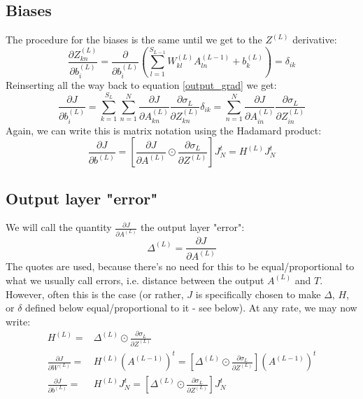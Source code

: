 \documentclass[12pt, a4paper]{article}
\numberwithin{equation}{section}
\begin{document}
\subsection{Biases}
The procedure for the biases is the same until we get to the $Z^{(L)}$ derivative:
\begin{equation}
\frac{\partial Z^{(L)}_{kn}}{\partial b^{(L)}_i}=\frac{\partial}{\partial b^{(L)}_i}\left(\sum_{l=1}^{S_{L-1}}W^{(L)}_{kl}A^{(L-1)}_{ln}+b^{(L)}_k\right)=\delta_{ik}
\end{equation}
Reinserting all the way back to equation \ref{output_grad} we get:
\begin{equation}
\frac{\partial J}{\partial b^{(L)}_i}=\sum_{k=1}^{S_L}\sum_{n=1}^N\frac{\partial J}{\partial A^{(L)}_{kn}}\frac{\partial\sigma_L}{\partial Z^{(L)}_{kn}}\delta_{ik}=\sum_{n=1}^N\frac{\partial J}{\partial A^{(L)}_{in}}\frac{\partial\sigma_L}{\partial Z^{(L)}_{in}}
\end{equation}
Again, we can write this is matrix notation using the Hadamard product:
\begin{equation}
\label{output_bias_matrix}
\frac{\partial J}{\partial b^{(L)}}=\left[\frac{\partial J}{\partial A^{(L)}}\odot\frac{\partial\sigma_L}{\partial Z^{(L)}}\right]J_N^t=H^{(L)}J_N^t
\end{equation}

\subsection{Output layer "error"}
We will call the quantity $\frac{\partial J}{\partial A^{(L)}}$ the output layer "error":
\begin{equation}
\Delta^{(L)}=\frac{\partial J}{\partial A^{(L)}}
\end{equation}
The quotes are used, because there's no need for this to be equal/proportional to what we usually call errors, i.e. distance between the output $A^{(L)}$ and $T$. However, often this is the case (or rather, $J$ is specifically chosen to make $\Delta$, $H$, or $\delta$ defined below equal/proportional to it - see below). At any rate, we may now write:
\begin{align}
\label{output_weights_H}
H^{(L)}=&\Delta^{(L)}\odot\frac{\partial\sigma_L}{\partial Z^{(L)}}\\
\frac{\partial J}{\partial W^{(L)}}=&H^{(L)}\left(A^{(L-1)}\right)^t=\left[\Delta^{(L)}\odot\frac{\partial\sigma_L}{\partial Z^{(L)}}\right]\left(A^{(L-1)}\right)^t\\
\label{output_bias_H}
\frac{\partial J}{\partial b^{(L)}}=&H^{(L)}J_N^t=\left[\Delta^{(L)}\odot\frac{\partial\sigma_L}{\partial Z^{(L)}}\right]J_N^t
\end{align}
\end{document}

